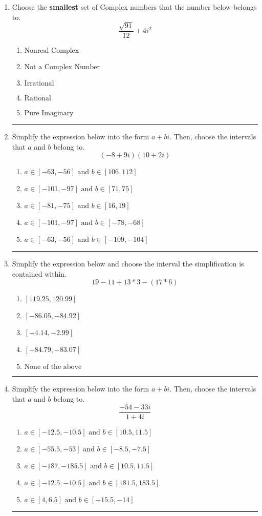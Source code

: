 \documentclass[14pt]{extbook}
\newcommand{\litem}[1]{\item#1\hspace*{-1cm}\rule{\textwidth}{0.4pt}}
\begin{document}
\begin{enumerate}
\litem{
Choose the \textbf{smallest} set of Complex numbers that the number below belongs to.\[ \frac{\sqrt{91}}{12}+4i^2 \]\begin{enumerate}[label=\Alph*.]
\item \( \text{Nonreal Complex} \)
\item \( \text{Not a Complex Number} \)
\item \( \text{Irrational} \)
\item \( \text{Rational} \)
\item \( \text{Pure Imaginary} \)

\end{enumerate} }
\litem{
Simplify the expression below into the form $a+bi$. Then, choose the intervals that $a$ and $b$ belong to.\[ (-8 + 9 i)(10 + 2 i) \]\begin{enumerate}[label=\Alph*.]
\item \( a \in [-63, -56] \text{ and } b \in [106, 112] \)
\item \( a \in [-101, -97] \text{ and } b \in [71, 75] \)
\item \( a \in [-81, -75] \text{ and } b \in [16, 19] \)
\item \( a \in [-101, -97] \text{ and } b \in [-78, -68] \)
\item \( a \in [-63, -56] \text{ and } b \in [-109, -104] \)

\end{enumerate} }
\litem{
Simplify the expression below and choose the interval the simplification is contained within.\[ 19 - 11 \div 13 * 3 - (17 * 6) \]\begin{enumerate}[label=\Alph*.]
\item \( [119.25, 120.99] \)
\item \( [-86.05, -84.92] \)
\item \( [-4.14, -2.99] \)
\item \( [-84.79, -83.07] \)
\item \( \text{None of the above} \)

\end{enumerate} }
\litem{
Simplify the expression below into the form $a+bi$. Then, choose the intervals that $a$ and $b$ belong to.\[ \frac{-54 - 33 i}{1 + 4 i} \]\begin{enumerate}[label=\Alph*.]
\item \( a \in [-12.5, -10.5] \text{ and } b \in [10.5, 11.5] \)
\item \( a \in [-55.5, -53] \text{ and } b \in [-8.5, -7.5] \)
\item \( a \in [-187, -185.5] \text{ and } b \in [10.5, 11.5] \)
\item \( a \in [-12.5, -10.5] \text{ and } b \in [181.5, 183.5] \)
\item \( a \in [4, 6.5] \text{ and } b \in [-15.5, -14] \)


\end{enumerate}}
\end{enumerate}
\end{document}

